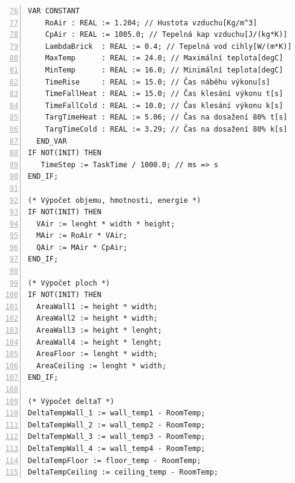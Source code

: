\begin{lstlisting}[language=ST, breaklines=true, numbers=left, firstnumber=76, numberstyle=\small, numbersep=10pt, frame=single, basicstyle=\ttfamily\small]
  VAR CONSTANT
    RoAir : REAL := 1.204; // Hustota vzduchu[Kg/m^3]
    CpAir : REAL := 1005.0; // Tepelná kap vzduchu[J/(kg*K)]
    LambdaBrick  : REAL := 0.4; // Tepelná vod cihly[W/(m*K)]
    MaxTemp      : REAL := 24.0; // Maximální teplota[degC]
    MinTemp      : REAL := 16.0; // Minimální teplota[degC]
    TimeRise     : REAL := 15.0; // Čas náběhu výkonu[s]
    TimeFallHeat : REAL := 15.0; // Čas klesání výkonu t[s]
    TimeFallCold : REAL := 10.0; // Čas klesání výkonu k[s]
    TargTimeHeat : REAL := 5.06; // Čas na dosažení 80% t[s]
    TargTimeCold : REAL := 3.29; // Čas na dosažení 80% k[s]
  END_VAR
IF NOT(INIT) THEN
   TimeStep := TaskTime / 1000.0; // ms => s
END_IF;

(* Výpočet objemu, hmotnosti, energie *)
IF NOT(INIT) THEN
  VAir := lenght * width * height;
  MAir := RoAir * VAir;
  QAir := MAir * CpAir;
END_IF;

(* Výpočet ploch *)
IF NOT(INIT) THEN
  AreaWall1 := height * width;
  AreaWall2 := height * width;
  AreaWall3 := height * lenght;
  AreaWall4 := height * lenght;
  AreaFloor := lenght * width;
  AreaCeiling := lenght * width;
END_IF;

(* Výpočet deltaT *)
DeltaTempWall_1 := wall_temp1 - RoomTemp;
DeltaTempWall_2 := wall_temp2 - RoomTemp;
DeltaTempWall_3 := wall_temp3 - RoomTemp;
DeltaTempWall_4 := wall_temp4 - RoomTemp;
DeltaTempFloor := floor_temp - RoomTemp;
DeltaTempCeiling := ceiling_temp - RoomTemp;

\end{lstlisting}
\pagebreak
